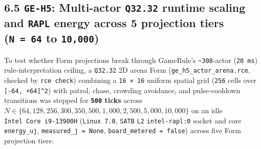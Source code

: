 \documentclass[10pt,letterpaper]{article}
\begin{document}
\subsection{\texorpdfstring{6.5 \texttt{GE-H5}: Multi-actor
\texttt{Q32.32} runtime scaling and \texttt{RAPL} energy across 5
projection tiers (\texttt{N\ =\ 64} to
\texttt{10,000})}{6.5 GE-H5: Multi-actor Q32.32 runtime scaling and RAPL energy across 5 projection tiers (N = 64 to 10,000)}}\label{ge-h5-multi-actor-q32.32-runtime-scaling-and-rapl-energy-across-5-projection-tiers-n-64-to-10000}

To test whether Form projections break through GameRule's
\texttt{\textasciitilde{}308}-actor (\texttt{20\ ms})
rule-interpretation ceiling, a \texttt{Q32.32} 2D arena Form
(\texttt{ge\_\allowbreak{}h5\_\allowbreak{}actor\_\allowbreak{}arena.\allowbreak{}rce}, checked by \texttt{rce\ check})
combining a \texttt{16\ ×\ 16} uniform spatial grid (\texttt{256} cells
over \texttt{{[}-64,\ +64{]}\^{}2}) with patrol, chase, crowding
avoidance, and pulse-cooldown transitions was stepped for
\textbf{\texttt{500} ticks} across
\(N \in \{64, 128, 256, 300, 350, 500, 1{,}000, 2{,}500, 5{,}000, 10{,}000\}\)
on an idle \texttt{Intel\ Core\ i9-\allowbreak{}13900H} (\texttt{Linux\ 7.\allowbreak{}0},
\texttt{SATB} \texttt{L2} \texttt{intel-\allowbreak{}rapl:0} socket and core
\texttt{energy\_\allowbreak{}uj}, \texttt{measured\_\allowbreak{}j\ =\ None},
\texttt{board\_\allowbreak{}metered\ =\ false}) across five Form projection tiers:
\end{document}
